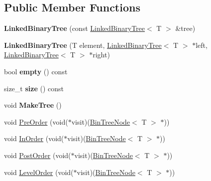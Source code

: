 \subsection*{Public Member Functions}
\begin{DoxyCompactItemize}
\item 
\mbox{\label{classLinkedBinaryTree_af79026e3ff32394af7fa4bc17104b2f2}} 
{\bfseries Linked\+Binary\+Tree} (const \hyperlink{classLinkedBinaryTree}{Linked\+Binary\+Tree}$<$ T $>$ \&tree)
\item 
\mbox{\label{classLinkedBinaryTree_a1c77aca3aaa8ff25dbacf718b6277fbf}} 
{\bfseries Linked\+Binary\+Tree} (T element, \hyperlink{classLinkedBinaryTree}{Linked\+Binary\+Tree}$<$ T $>$ $\ast$left, \hyperlink{classLinkedBinaryTree}{Linked\+Binary\+Tree}$<$ T $>$ $\ast$right)
\item 
\mbox{\label{classLinkedBinaryTree_a31090e85a7b2a6b8cad23717ec433ceb}} 
bool {\bfseries empty} () const
\item 
\mbox{\label{classLinkedBinaryTree_a7ec639d841538074a028211d9a4362e8}} 
size\+\_\+t {\bfseries size} () const
\item 
\mbox{\label{classLinkedBinaryTree_a61115f0284fc3ab3ff46fe24a2ba83e9}} 
void {\bfseries Make\+Tree} ()
\item 
void \hyperlink{classLinkedBinaryTree_ab6a897c3961294d56cd83790aaa3ff9c}{Pre\+Order} (void($\ast$visit)(\hyperlink{structBinTreeNode}{Bin\+Tree\+Node}$<$ T $>$ $\ast$))
\item 
void \hyperlink{classLinkedBinaryTree_a82b1a5995e90671905da7502d7f58eba}{In\+Order} (void($\ast$visit)(\hyperlink{structBinTreeNode}{Bin\+Tree\+Node}$<$ T $>$ $\ast$))
\item 
void \hyperlink{classLinkedBinaryTree_ad8a0144cc092a677eb2b3189059dd19f}{Post\+Order} (void($\ast$visit)(\hyperlink{structBinTreeNode}{Bin\+Tree\+Node}$<$ T $>$ $\ast$))
\item 
void \hyperlink{classLinkedBinaryTree_a5ca48cd9b784ca7cdf0f41d03dbc4873}{Level\+Order} (void($\ast$visit)(\hyperlink{structBinTreeNode}{Bin\+Tree\+Node}$<$ T $>$ $\ast$))
\item 
\mbox{\label{classLinkedBinaryTree_a43286c1f8b340ff84e73a0f103ebbfe2}} 

\end{DoxyCompactItemize}
